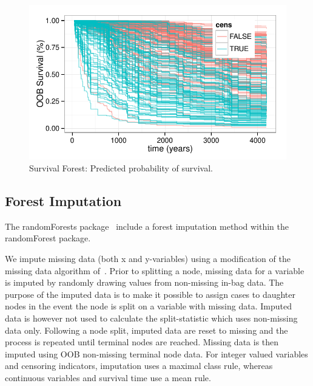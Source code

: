 \documentclass[nojss]{jss}\usepackage[]{graphicx}\usepackage[]{color}
\makeatletter
\def\maxwidth{ %
  \ifdim\Gin@nat@width>\linewidth
    \linewidth
  \else
    \Gin@nat@width
  \fi
}
\newenvironment{knitrout}{}{} %
\makeatother
\begin{document}
\begin{knitrout}\footnotesize
{}\color{fgcolor}\begin{figure}[!htpb]


{\centering \includegraphics[width=\maxwidth]{figure/beamer-surv-rf-plot-1} 

}

\caption[Survival Forest]{Survival Forest: Predicted probability of survival.\label{fig:surv-rf-plot}}
\end{figure}


\end{knitrout}


\subsection{Forest Imputation}\label{S:imputation}

The randomForests package~\citep{liaw:2002} include a forest imputation method within the randomForest package. 

We impute missing data (both x and y-variables) using a modification of the missing data algorithm of~\cite{Ishwaran:2008}. Prior to splitting a node, missing data for a variable is imputed by randomly drawing values from non-missing in-bag data. The purpose of the imputed data is to make it possible to assign cases to daughter nodes in the event the node is split on a variable with missing data. Imputed data is however not used to calculate the split-statistic which uses non-missing data only. Following a node split, imputed data are reset to missing and the process is repeated until terminal nodes are reached. Missing data is then imputed using OOB non-missing terminal node data. For integer valued variables and censoring indicators, imputation uses a maximal class rule, whereas continuous variables and survival time use a mean rule.
\end{document}
